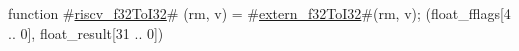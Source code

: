 function #\hyperref[sailRISCVzriscvzyf32ToI32]{riscv\_f32ToI32}# (rm, v) = {
  #\hyperref[sailRISCVzexternzyf32ToI32]{extern\_f32ToI32}#(rm, v);
  (float_fflags[4 .. 0], float_result[31 .. 0])
}
